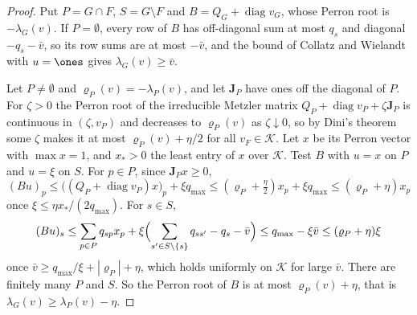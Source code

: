 \begin{proof}
Put $P=G\cap F$, $S=G\setminus F$ and $B=Q_G+\operatorname{diag}v_G$, whose
Perron root is $-\lambda_G(v)$. If $P=\emptyset$, every row of $B$ has
off-diagonal sum at most $q_s$ and diagonal $-q_s-\bar v$, so its row sums are at most
$-\bar v$, and the bound of Collatz and Wielandt with $u=\ones$ gives $\lambda_G(v)\ge \bar v$.

Let $P\ne\emptyset$ and $\varrho_P(v)=-\lambda_P(v)$, and let $\mathbf J_P$ have
ones off the diagonal of $P$. For $\zeta>0$ the Perron root of the irreducible
Metzler matrix $Q_P+\operatorname{diag}v_P+\zeta\mathbf J_P$ is continuous in
$(\zeta,v_P)$ and decreases to $\varrho_P(v)$ as $\zeta\downarrow0$, so by Dini's
theorem some $\zeta$ makes it at most $\varrho_P(v)+\eta/2$ for all
$v_F\in\mathcal K$. Let $x$ be its Perron vector with $\max x=1$, and $x_*>0$ the
least entry of $x$ over $\mathcal K$. Test $B$ with $u=x$ on $P$ and $u=\xi$ on
$S$. For $p\in P$, since $\mathbf J_Px\ge0$,
\[
 (Bu)_p\le\bigl((Q_P+\operatorname{diag}v_P)x\bigr)_p+\xi q_{\max}
 \le(\varrho_P+\tfrac\eta2)x_p+\xi q_{\max}\le(\varrho_P+\eta)x_p
\]
once $\xi\le\eta x_*/(2q_{\max})$. For $s\in S$,
\[
 (Bu)_s\le\sum_{p\in P}q_{sp}x_p+\xi\Bigl(\sum_{s'\in S\setminus\{s\}}q_{ss'}-q_s-\bar v\Bigr)
 \le q_{\max}-\xi \bar v\le(\varrho_P+\eta)\xi
\]
once $\bar v\ge q_{\max}/\xi+|\varrho_P|+\eta$, which holds uniformly on
$\mathcal K$ for large $\bar v$. There are finitely many $P$ and $S$. So the Perron
root of $B$ is at most $\varrho_P(v)+\eta$, that is
$\lambda_G(v)\ge\lambda_P(v)-\eta$.
\end{proof}

